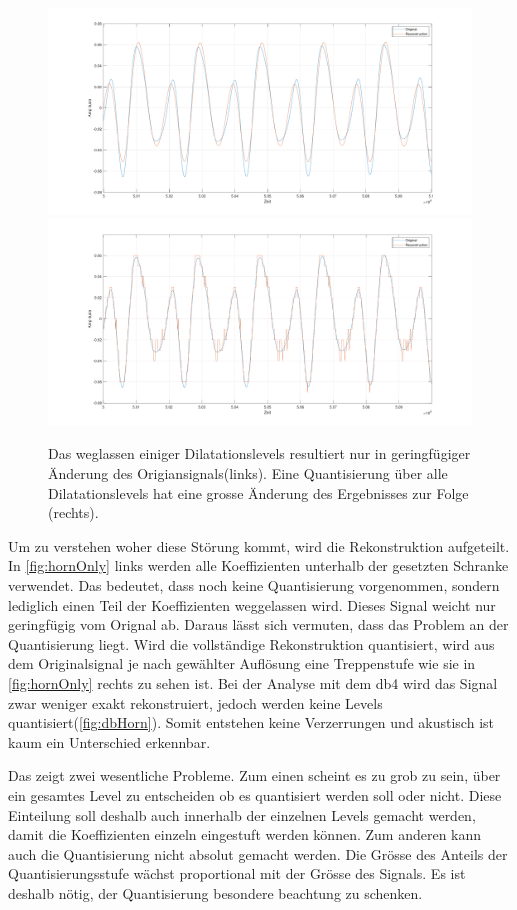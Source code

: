 \begin{refsection}
\begin{figure}
	\includegraphics[width=0.5\linewidth]{papers/compress/Bilder/hornOnlyLevs.pdf}
	\includegraphics[width=0.5\linewidth]{papers/compress/Bilder/hornOnlyQuant.pdf}
	\caption{Das weglassen einiger Dilatationslevels resultiert nur in geringfügiger Änderung des Origiansignals(links).
		Eine Quantisierung über alle Dilatationslevels hat eine grosse Änderung des Ergebnisses zur Folge (rechts).}
	\label{fig:hornOnly}
\end{figure}
Um zu verstehen woher diese Störung kommt, wird die Rekonstruktion aufgeteilt.
In \autoref{fig:hornOnly} links werden alle Koeffizienten unterhalb der gesetzten Schranke verwendet. 
Das bedeutet, dass noch keine Quantisierung vorgenommen, sondern lediglich einen Teil der Koeffizienten weggelassen wird.
Dieses Signal weicht nur geringfügig vom Orignal ab.
Daraus lässt sich vermuten, dass das Problem an der Quantisierung liegt.
Wird die vollständige Rekonstruktion quantisiert, wird aus dem Originalsignal je nach gewählter Auflösung eine Treppenstufe wie sie in \autoref{fig:hornOnly} rechts zu sehen ist.
Bei der Analyse mit dem db4 wird das Signal zwar weniger exakt rekonstruiert, jedoch werden keine Levels quantisiert(\autoref{fig:dbHorn}).
Somit entstehen keine Verzerrungen und akustisch ist kaum ein Unterschied erkennbar.

Das zeigt zwei wesentliche Probleme.
Zum einen scheint es zu grob zu sein, über ein gesamtes Level zu entscheiden ob es quantisiert werden soll oder nicht.
Diese Einteilung soll deshalb auch innerhalb der einzelnen Levels gemacht werden, damit die Koeffizienten einzeln eingestuft werden können.
Zum anderen kann auch die Quantisierung nicht absolut gemacht werden.
Die Grösse des Anteils der Quantisierungsstufe wächst proportional mit der Grösse des Signals.
Es ist deshalb nötig, der Quantisierung besondere beachtung zu schenken.


\end{refsection}
